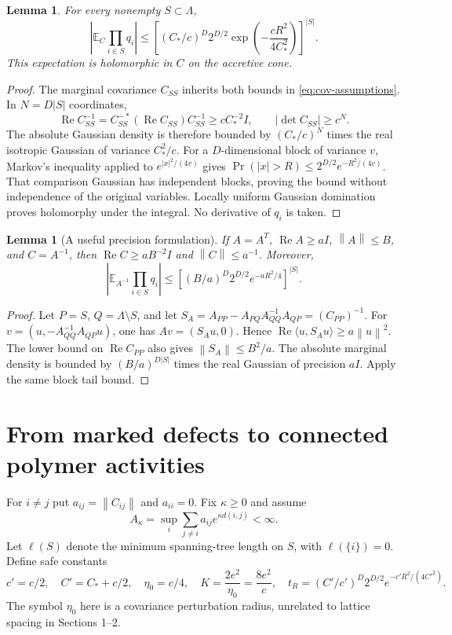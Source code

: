 \documentclass[11pt]{article}
\newtheorem{lemma}[theorem]{Lemma}
\theoremstyle{remark}
\newcommand{\E}{\mathbb E}
\newcommand{\Rea}{\operatorname{Re}}
\newcommand{\norm}[1]{\left\|#1\right\|}
\begin{document}
\begin{lemma}\label{lem:tail}
For every nonempty $S\subset\Lambda$,
\[
 \left|\E_C\prod_{i\in S}q_i\right|
 \le\left[
  (C_*/c)^D 2^{D/2}
  \exp\!\left(-\frac{cR^2}{4C_*^2}\right)
 \right]^{|S|}.
\]
This expectation is holomorphic in $C$ on the accretive cone.
\end{lemma}

\begin{proof}
The marginal covariance $C_{SS}$ inherits both bounds in
\eqref{eq:cov-assumptions}. In $N=D|S|$ coordinates,
\[
 \Rea C_{SS}^{-1}
 =C_{SS}^{-*}(\Rea C_{SS})C_{SS}^{-1}
 \ge cC_*^{-2}I,
 \qquad |\det C_{SS}|\ge c^N.
\]
The absolute Gaussian density is therefore bounded by $(C_*/c)^N$
times the real isotropic Gaussian of variance $C_*^2/c$.
For a $D$-dimensional block of variance $v$,
Markov's inequality applied to $e^{|x|^2/(4v)}$ gives
$\Pr(|x|>R)\le2^{D/2}e^{-R^2/(4v)}$.
That comparison Gaussian has independent blocks, proving the bound
without independence of the original variables.
Locally uniform Gaussian domination proves holomorphy under the
integral. No derivative of $q_i$ is taken.
\end{proof}

\begin{lemma}[A useful precision formulation]\label{lem:precision}
If $A=A^T$, $\Rea A\ge aI$, $\norm A\le B$, and $C=A^{-1}$, then
$\Rea C\ge aB^{-2}I$ and $\norm C\le a^{-1}$. Moreover,
\[
 \left|\E_{A^{-1}}\prod_{i\in S}q_i\right|
 \le\left[(B/a)^D2^{D/2}e^{-aR^2/4}\right]^{|S|}.
\]
\end{lemma}

\begin{proof}
Let $P=S$, $Q=\Lambda\setminus S$, and let
$S_A=A_{PP}-A_{PQ}A_{QQ}^{-1}A_{QP}=(C_{PP})^{-1}$.
For $v=(u,-A_{QQ}^{-1}A_{QP}u)$, one has $Av=(S_Au,0)$.
Hence $\Rea\langle u,S_Au\rangle\ge a\norm u^2$.
The lower bound on $\Rea C_{PP}$ also gives $\norm{S_A}\le B^2/a$.
The absolute marginal density is bounded by $(B/a)^{D|S|}$ times
the real Gaussian of precision $aI$. Apply the same block tail bound.
\end{proof}

\section{From marked defects to connected polymer activities}

For $i\ne j$ put $a_{ij}=\norm{C_{ij}}$ and $a_{ii}=0$.
Fix $\kappa\ge0$ and assume
\begin{equation}\label{eq:row-sum}
 A_\kappa=\sup_i\sum_{j\ne i}a_{ij}e^{\kappa d(i,j)}<\infty.
\end{equation}
Let $\ell(S)$ denote the minimum spanning-tree length on $S$, with
$\ell(\{i\})=0$. Define safe constants
\begin{equation}\label{eq:constants}
 c'=c/2,\quad C'=C_*+c/2,\quad \eta_0=c/4,\quad
 K=\frac{2e^2}{\eta_0}=\frac{8e^2}{c},\quad
 t_R=(C'/c')^D2^{D/2}e^{-c'R^2/(4C'^2)}.
\end{equation}
The symbol $\eta_0$ here is a covariance perturbation radius, unrelated
to lattice spacing in Sections 1--2.
\end{document}
